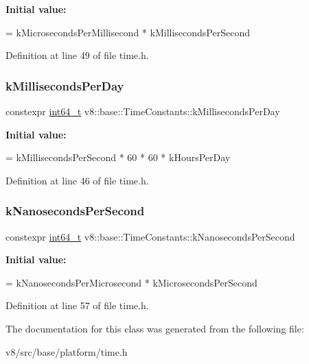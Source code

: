 {\bfseries Initial value\+:}
\begin{DoxyCode}
=
      kMicrosecondsPerMillisecond * kMillisecondsPerSecond
\end{DoxyCode}


Definition at line 49 of file time.\+h.

\mbox{\label{classv8_1_1base_1_1TimeConstants_a23b062121eff609beec0ab41f4ab4895}} 
\subsubsection{\texorpdfstring{k\+Milliseconds\+Per\+Day}{kMillisecondsPerDay}}
{\footnotesize\ttfamily constexpr \mbox{\hyperlink{classint64__t}{int64\+\_\+t}} v8\+::base\+::\+Time\+Constants\+::k\+Milliseconds\+Per\+Day\hspace{0.3cm}{\ttfamily [static]}}

{\bfseries Initial value\+:}
\begin{DoxyCode}
=
      kMillisecondsPerSecond * 60 * 60 * kHoursPerDay
\end{DoxyCode}


Definition at line 46 of file time.\+h.

\mbox{\label{classv8_1_1base_1_1TimeConstants_a69135d50993fe40feea17e45158377fa}} 
\subsubsection{\texorpdfstring{k\+Nanoseconds\+Per\+Second}{kNanosecondsPerSecond}}
{\footnotesize\ttfamily constexpr \mbox{\hyperlink{classint64__t}{int64\+\_\+t}} v8\+::base\+::\+Time\+Constants\+::k\+Nanoseconds\+Per\+Second\hspace{0.3cm}{\ttfamily [static]}}

{\bfseries Initial value\+:}
\begin{DoxyCode}
=
      kNanosecondsPerMicrosecond * kMicrosecondsPerSecond
\end{DoxyCode}


Definition at line 57 of file time.\+h.



The documentation for this class was generated from the following file\+:\begin{DoxyCompactItemize}
\item 
v8/src/base/platform/time.\+h\end{DoxyCompactItemize}
